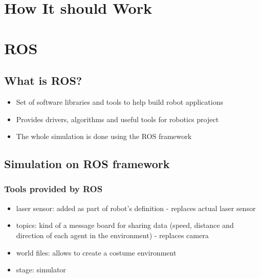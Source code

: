\documentclass[a0,portrait]{a0poster}
\begin{document}
\begin{multicols}{2}

  \color{Black} %

  \section*{How It should Work}

  \begin{center}\vspace{1cm}
  \end{center}
  \vspace{1cm}

  \section*{ROS}
  \subsection*{What is ROS?}
  \begin{itemize}
  \item Set of software libraries and tools to help build robot applications
  \item Provides drivers, algorithms and useful tools for robotics project
  \item The whole simulation is done using the ROS framework
  \end{itemize}
  \subsection*{Simulation on ROS framework}
  \subsubsection*{Tools provided by ROS}
  \begin{itemize}
  \item laser sensor: added as part of robot's definition - replaces actual laser sensor
  \item topics: kind of a message board for sharing data (speed, distance and direction of each agent in the environment) - replaces camera
  \item world files: allows to create a costume environment
  \item stage: simulator
  \end{itemize}


\end{multicols}
\end{document}
